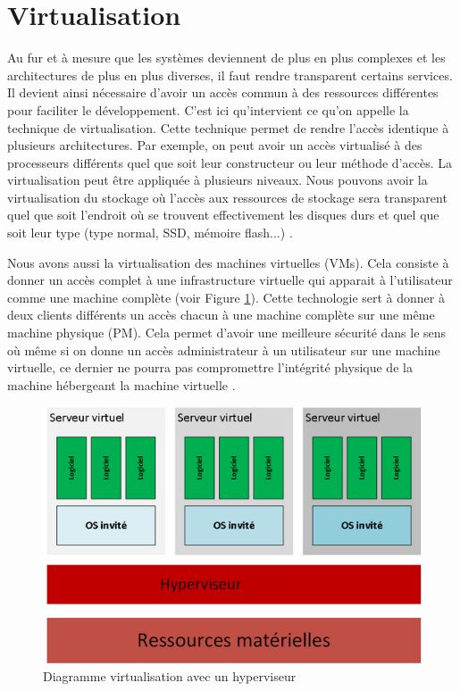 \section{Virtualisation}
\begin{onehalfspace}
Au fur et à mesure que les systèmes deviennent de plus en plus complexes et les architectures de plus en plus diverses, il faut rendre transparent certains services. Il devient ainsi nécessaire d’avoir un accès commun à des ressources différentes pour faciliter le développement. C'est ici qu'intervient ce qu'on appelle la technique de  virtualisation. Cette technique permet de  rendre l’accès identique à plusieurs architectures. Par exemple, on peut avoir un accès virtualisé à des processeurs différents quel que soit leur constructeur ou leur méthode d’accès. La virtualisation peut être appliquée à plusieurs niveaux. Nous pouvons avoir la virtualisation du stockage où l'accès aux ressources de stockage sera transparent quel que soit l’endroit où se trouvent effectivement les disques durs et quel que soit  leur type (type normal, SSD, mémoire flash...) \cite{ref24}.\medskip 

Nous avons aussi  la virtualisation des machines virtuelles (VMs). Cela consiste à donner un accès complet à une infrastructure virtuelle qui apparait à l'utilisateur comme une machine complète (voir Figure \ref{Diagramme virtualisation avec un hyperviseur }). Cette technologie sert à donner à deux clients différents un accès chacun à une machine complète sur une même machine physique (PM). Cela permet d'avoir une meilleure sécurité dans le sens où même si on donne un accès administrateur à un utilisateur sur une machine virtuelle, ce dernier  ne pourra pas compromettre l'intégrité physique de la machine hébergeant la machine virtuelle \cite{ref25}. \medskip 
\clearpage
\begin{figure}[!h]
\begin{center}
\includegraphics[scale=1]{figures/2.png} 
\end{center}
\caption{Diagramme virtualisation avec un hyperviseur }
\label{Diagramme virtualisation avec un hyperviseur }
\end{figure}



\end{onehalfspace}
